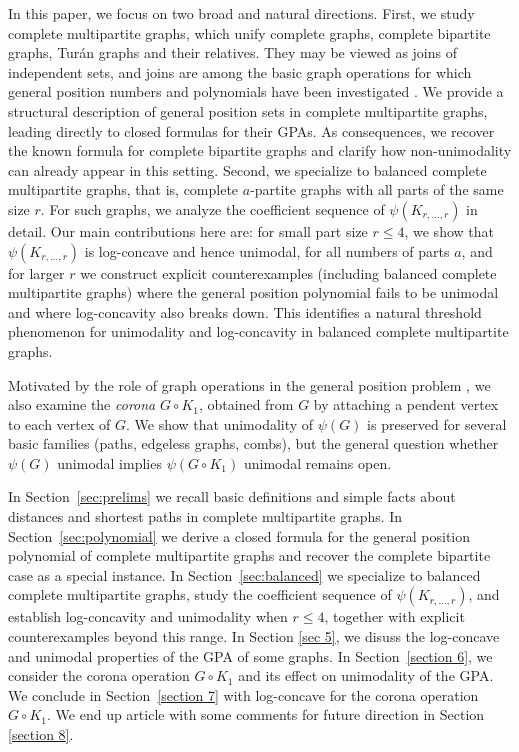 \documentclass[12pt,twoside]{article}
\begin{document}
In this paper, we focus on two broad and natural directions. First, we study  complete multipartite graphs, which unify complete graphs, complete bipartite graphs, Turán graphs and their relatives. They may be viewed as joins of independent sets, and joins are among the basic graph operations for which general position numbers and polynomials have been investigated \cite{0,10,17,21,23,bilalsc,bilaltcs}. We provide a structural description of general position sets in complete multipartite graphs, leading directly to closed formulas for their GPAs. As consequences,  we recover the known formula for complete bipartite graphs and clarify how non-unimodality can already appear in this setting. Second, we specialize to  balanced complete multipartite graphs, that is, complete $a$-partite graphs with all parts of the same size $r$. For such graphs, we analyze the coefficient sequence of $\psi(K_{r,\dots,r})$ in detail. Our main contributions here are: for small part size $r\le 4$, we show that $\psi(K_{r,\dots,r})$ is 	log-concave and hence unimodal, for all numbers of parts $a$, and  for larger $r$ we construct explicit counterexamples (including 	balanced complete multipartite graphs) where the general position
polynomial fails to be unimodal and where log-concavity also breaks down. 
This identifies a natural threshold phenomenon for unimodality and log-concavity in balanced complete multipartite graphs.

Motivated by the role of graph operations in the general position problem
\cite{0,10,17,20,21,23}, we also examine the \emph{corona} $G\circ K_1$,
obtained from $G$ by attaching a pendent vertex to each vertex of $G$. We show
that unimodality of $\psi(G)$ is preserved for several basic families (paths,
edgeless graphs, combs), but the general question whether $\psi(G)$ unimodal
implies $\psi(G\circ K_1)$ unimodal remains open.

\medskip
 In Section~\ref{sec:prelims} we recall basic definitions and simple facts about distances and shortest paths in complete multipartite graphs. In Section~\ref{sec:polynomial} we derive a closed formula for the general
position polynomial of complete multipartite graphs and recover the complete
bipartite case as a special instance.  In Section~\ref{sec:balanced} we
specialize to balanced complete multipartite graphs, study the coefficient
sequence of $\psi(K_{r,\dots,r})$, and establish log-concavity and unimodality
when $r\le 4$, together with explicit counterexamples beyond this range.  In Section \ref{sec 5}, we disuss the log-concave and unimodal properties of the GPA of some graphs. In
Section~\ref{section 6},  we consider the corona operation $G\circ K_1$ and
its effect on unimodality of the GPA. We conclude in Section~\ref{section 7} with log-concave for the corona operation $G\circ K_1$. We end up article with some comments for future direction in Section \ref{section 8}.	
\end{document}
